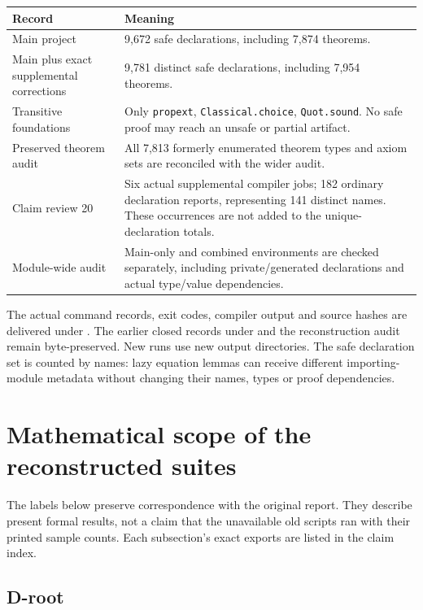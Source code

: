 \begin{longtable}{@{}p{}p{}@{}}
\toprule Record & Meaning\\\midrule\endhead
Main project & 9,672 safe declarations, including 7,874 theorems.\\
Main plus exact supplemental corrections & 9,781 distinct safe declarations, including 7,954 theorems.\\
Transitive foundations & Only \texttt{propext}, \texttt{Classical.choice}, \texttt{Quot.sound}. No safe proof may reach an unsafe or partial artifact.\\
Preserved theorem audit & All 7,813 formerly enumerated theorem types and axiom sets are reconciled with the wider audit.\\
Claim review 20 & Six actual supplemental compiler jobs; 182 ordinary declaration reports, representing 141 distinct names. These occurrences are not added to the unique-declaration totals.\\
Module-wide audit & Main-only and combined environments are checked separately, including private/generated declarations and actual type/value dependencies.\\
\bottomrule\end{longtable}

The actual command records, exit codes, compiler output and source hashes are delivered under . The earlier closed records under  and the reconstruction audit remain byte-preserved. New runs use new output directories. The safe declaration set is counted by names: lazy equation lemmas can receive different importing-module metadata without changing their names, types or proof dependencies.

\section{Mathematical scope of the reconstructed suites}\label{what-each-suite-actually-checks}

The labels below preserve correspondence with the original report. They describe present formal results, not a claim that the unavailable old scripts ran with their printed sample counts. Each subsection's exact exports are listed in the claim index.

\subsection{D-root}\label{d-root}

